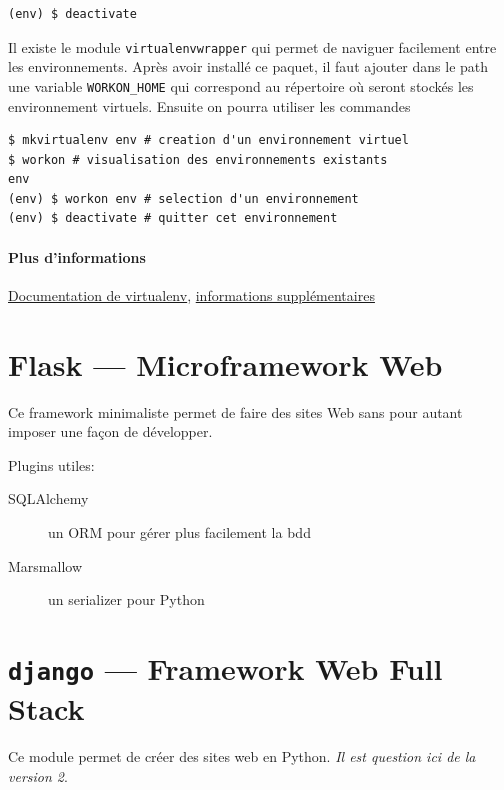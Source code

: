 \documentclass[a4paper, 10pt]{article}
\begin{document}
\begin{verbatim}
(env) $ deactivate
\end{verbatim}

Il existe le module \texttt{virtualenvwrapper} qui permet de naviguer facilement entre les environnements. Après avoir installé ce paquet, il faut ajouter dans le path une variable \texttt{WORKON_HOME} qui correspond au répertoire où seront stockés les environnement virtuels. Ensuite on pourra utiliser les commandes

\begin{verbatim}
$ mkvirtualenv env # creation d'un environnement virtuel
$ workon # visualisation des environnements existants
env
(env) $ workon env # selection d'un environnement
(env) $ deactivate # quitter cet environnement
\end{verbatim}

\paragraph{Plus d'informations} \href{https://virtualenv.pypa.io/en/stable/}{Documentation de virtualenv}, \href{http://sametmax.com/les-environnement-virtuels-python-virtualenv-et-virtualenvwrapper/}{informations supplémentaires}


\section{Flask --- Microframework Web}

Ce framework minimaliste permet de faire des sites Web sans pour autant imposer une façon de développer.

Plugins utiles:
\begin{description}
    \item[SQLAlchemy] un ORM pour gérer plus facilement la bdd
    \item[Marsmallow] un serializer pour Python 
\end{description}


\section[{\footnotesize\texttt{django}} --- Framework Web Full Stack]{{\normalfont\large\bfseries\texttt{django}} --- Framework Web Full Stack}
Ce  module permet de créer des sites web en Python. \emph{Il est question ici de la version 2}.
\end{document}
